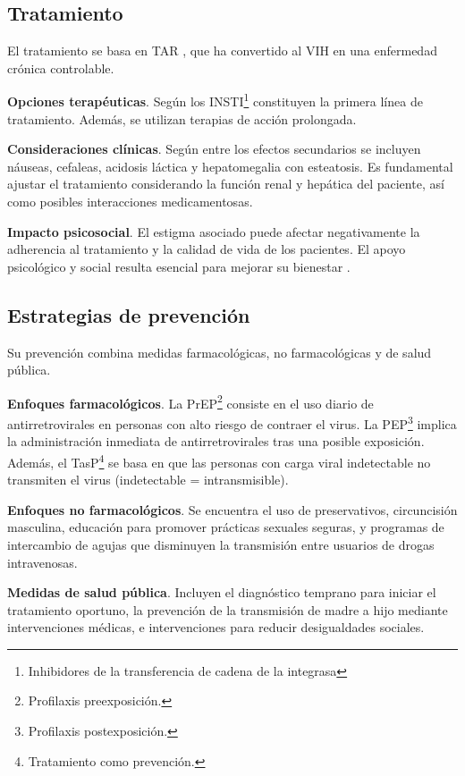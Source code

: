\subsection{Tratamiento}
El tratamiento se basa en TAR \cite{heendeniya2019antiretroviral}, que ha convertido al VIH en una enfermedad crónica controlable.

\textbf{Opciones terapéuticas}. Según \cite{sivanandy2023efficacy.} los INSTI\footnote{Inhibidores de la transferencia de cadena de la integrasa} constituyen la primera línea de tratamiento. Además, se utilizan terapias de acción prolongada.

\textbf{Consideraciones clínicas}. Según \cite{saag2021hiv} entre los efectos secundarios se incluyen náuseas, cefaleas, acidosis láctica y hepatomegalia con esteatosis. Es fundamental ajustar el tratamiento considerando la función renal y hepática del paciente, así como posibles interacciones medicamentosas.

\textbf{Impacto psicosocial}. El estigma asociado puede afectar negativamente la adherencia al tratamiento y la calidad de vida de los pacientes. El apoyo psicológico y social resulta esencial para mejorar su bienestar  \cite{cihlar2016current}.

\subsection{Estrategias de prevención}
Su prevención \cite{chan2012biomedical} combina medidas farmacológicas, no farmacológicas y de salud pública.

\textbf{Enfoques farmacológicos}.
La PrEP\footnote{Profilaxis preexposición.} consiste en el uso diario de antirretrovirales en personas con alto riesgo de contraer el virus. La PEP\footnote{Profilaxis postexposición.} implica la administración inmediata de antirretrovirales tras una posible exposición. Además, el TasP\footnote{Tratamiento como prevención.} se basa en que las personas con carga viral indetectable no transmiten el virus (indetectable = intransmisible).

\textbf{Enfoques no farmacológicos}.
Se encuentra el uso de preservativos, circuncisión masculina, educación para promover prácticas sexuales seguras, y programas de intercambio de agujas que disminuyen la transmisión entre usuarios de drogas intravenosas.

\textbf{Medidas de salud pública}.
Incluyen el diagnóstico temprano para iniciar el tratamiento oportuno, la prevención de la transmisión de madre a hijo mediante intervenciones médicas, e intervenciones para reducir desigualdades sociales.

